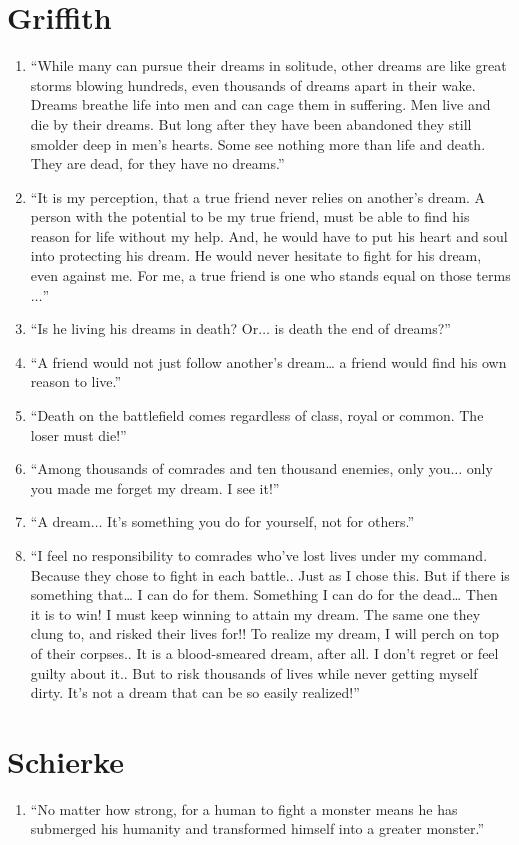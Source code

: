 \documentclass{book}
\numberwithin{equation}{section}
\begin{document}
\section{Griffith}
\begin{enumerate}
    \item ``While many can pursue their dreams in solitude, other dreams are like great storms blowing hundreds, even thousands of dreams apart in their wake. Dreams breathe life into men and can cage them in suffering. Men live and die by their dreams. But long after they have been abandoned they still smolder deep in men's hearts. Some see nothing more than life and death. They are dead, for they have no dreams.''
    \item ``It is my perception, that a true friend never relies on another's dream. A person with the potential to be my true friend, must be able to find his reason for life without my help. And, he would have to put his heart and soul into protecting his dream. He would never hesitate to fight for his dream, even against me. For me, a true friend is one who stands equal on those terms$\ldots$''
    \item ``Is he living his dreams in death? Or$\ldots$ is death the end of dreams?''
    \item ``A friend would not just follow another's dream… a friend would find his own reason to live.''
    \item ``Death on the battlefield comes regardless of class, royal or common. The loser must die!''
    \item ``Among thousands of comrades and ten thousand enemies, only you$\ldots$ only you made me forget my dream. I see it!''
    \item ``A dream$\ldots$ It's something you do for yourself, not for others.''
    \item ``I feel no responsibility to comrades who've lost lives under my command. Because they chose to fight in each battle.. Just as I chose this. But if there is something that… I can do for them. Something I can do for the dead… Then it is to win! I must keep winning to attain my dream. The same one they clung to, and risked their lives for!! To realize my dream, I will perch on top of their corpses.. It is a blood-smeared dream, after all. I don't regret or feel guilty about it.. But to risk thousands of lives while never getting myself dirty. It's not a dream that can be so easily realized!''
\end{enumerate}

\section{Schierke}
\begin{enumerate}
    \item ``No matter how strong, for a human to fight a monster means he has submerged his humanity and transformed himself into a greater monster.''
\end{enumerate}
\end{document}
